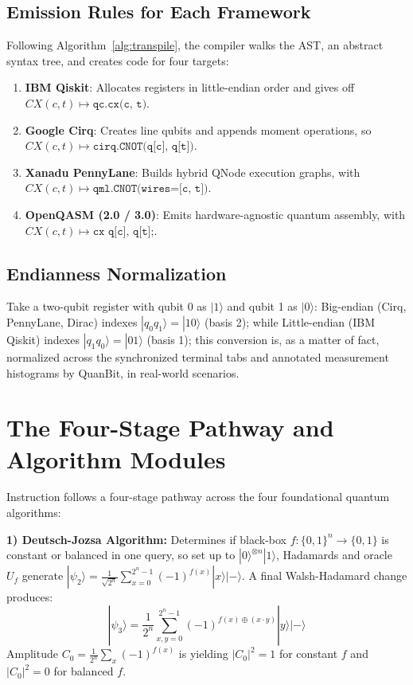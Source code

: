 \documentclass[conference]{IEEEtran}
\begin{document}
\subsection{Emission Rules for Each Framework}
Following Algorithm~\ref{alg:transpile}, the compiler walks the AST, an abstract syntax tree, and creates code for four targets:
\begin{enumerate}[leftmargin=*,noitemsep,topsep=1pt]
    \item \textbf{IBM Qiskit}: Allocates registers in little-endian order and gives off $CX(c, t) \mapsto \texttt{qc.cx(c, t)}$.
    \item \textbf{Google Cirq}: Creates line qubits and appends moment operations, so $CX(c, t) \mapsto \texttt{cirq.CNOT(q[c], q[t])}$.
    \item \textbf{Xanadu PennyLane}: Builds hybrid QNode execution graphs, with $CX(c, t) \mapsto \texttt{qml.CNOT(wires=[c, t])}$.
    \item \textbf{OpenQASM (2.0 / 3.0)}: Emits hardware-agnostic quantum assembly, with $CX(c, t) \mapsto \texttt{cx q[c], q[t];}$.
\end{enumerate}

\subsection{Endianness Normalization}
Take a two-qubit register with qubit 0 as $|1\rangle$ and qubit 1 as $|0\rangle$: Big-endian (Cirq, PennyLane, Dirac) indexes $|q_0 q_1\rangle = |10\rangle$ (basis 2); while Little-endian (IBM Qiskit) indexes $|q_1 q_0\rangle = |01\rangle$ (basis 1); this conversion is, as a matter of fact, normalized across the synchronized terminal tabs and annotated measurement histograms by QuanBit, in real-world scenarios.

\section{The Four-Stage Pathway and Algorithm Modules}
\label{sec:curriculum}

Instruction follows a four-stage pathway across the four foundational quantum algorithms:

\noindent\textbf{1) Deutsch-Jozsa Algorithm:} Determines if black-box $f: \{0,1\}^n \to \{0,1\}$ is constant or balanced in one query, so set up to $|0\rangle^{\otimes n}|1\rangle$, Hadamards and oracle $U_f$ generate $|\psi_2\rangle = \frac{1}{\sqrt{2^n}}\sum_{x=0}^{2^n-1}(-1)^{f(x)}|x\rangle|-\rangle$. A final Walsh-Hadamard change produces:
\begin{equation}
|\psi_3\rangle = \frac{1}{2^n}\sum_{x,y=0}^{2^n-1}(-1)^{f(x) \oplus (x \cdot y)} |y\rangle |-\rangle
\end{equation}
Amplitude $C_0 = \frac{1}{2^n}\sum_x (-1)^{f(x)}$ is yielding $|C_0|^2 = 1$ for constant $f$ and $|C_0|^2 = 0$ for balanced $f$.
\end{document}
